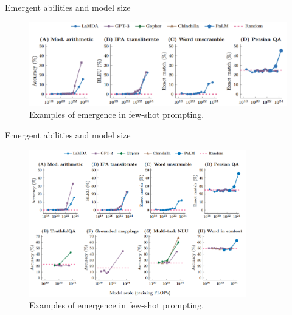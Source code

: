 \begin{vbframe}{Emergent abilities and model size}

\vfill

\begin{figure}
    \centering
    \includegraphics[width=13cm]{figure/emergent_abilities2.png}
    \caption{Examples of emergence in few-shot prompting. }
\end{figure}

\vfill

\end{vbframe}
\begin{vbframe}{Emergent abilities and model size}

\vfill

\begin{figure}
    \centering
    \includegraphics[width=0.84\textwidth]{figure/emergent_abilities.png}
    \caption{Examples of emergence in few-shot prompting. }
    \label{fig:emergent_abilities}
\end{figure}

\vfill

\end{vbframe}


